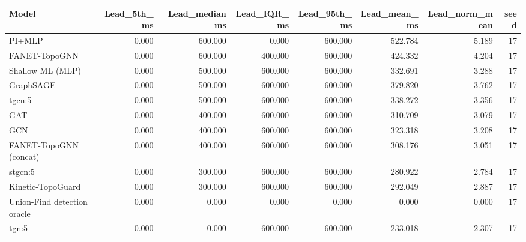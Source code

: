 \begin{tabular}{lrrrrrrr}
\toprule
Model & Lead\_5th\_ms & Lead\_median\_ms & Lead\_IQR\_ms & Lead\_95th\_ms & Lead\_mean\_ms & Lead\_norm\_mean & seed \\
\midrule
PI+MLP & 0.000 & 600.000 & 0.000 & 600.000 & 522.784 & 5.189 & 17 \\
FANET-TopoGNN & 0.000 & 600.000 & 400.000 & 600.000 & 424.332 & 4.204 & 17 \\
Shallow ML (MLP) & 0.000 & 500.000 & 600.000 & 600.000 & 332.691 & 3.288 & 17 \\
GraphSAGE & 0.000 & 500.000 & 600.000 & 600.000 & 379.820 & 3.762 & 17 \\
tgcn:5 & 0.000 & 500.000 & 600.000 & 600.000 & 338.272 & 3.356 & 17 \\
GAT & 0.000 & 400.000 & 600.000 & 600.000 & 310.709 & 3.079 & 17 \\
GCN & 0.000 & 400.000 & 600.000 & 600.000 & 323.318 & 3.208 & 17 \\
FANET-TopoGNN (concat) & 0.000 & 400.000 & 600.000 & 600.000 & 308.176 & 3.051 & 17 \\
stgcn:5 & 0.000 & 300.000 & 600.000 & 600.000 & 280.922 & 2.784 & 17 \\
Kinetic-TopoGuard & 0.000 & 300.000 & 600.000 & 600.000 & 292.049 & 2.887 & 17 \\
Union-Find detection oracle & 0.000 & 0.000 & 0.000 & 0.000 & 0.000 & 0.000 & 17 \\
tgn:5 & 0.000 & 0.000 & 600.000 & 600.000 & 233.018 & 2.307 & 17 \\
\bottomrule
\end{tabular}